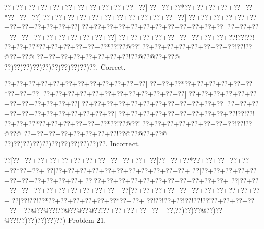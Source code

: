 \documentclass[a5paper]{article}
\begin{document}
\begin{center}
{\goo
\0??+\0??+\0??+\0??+\0??+\0??+\0??+\0??+\0??+\0??+\0??+\0??]
\0??+\0??+\0??*\0??+\0??+\0??+\0??+\0??+\0??*\0??+\0??+\0??]
\0??+\0??+\0??+\0??+\0??+\0??+\0??+\0??+\0??+\0??+\0??+\0??]
\0??+\0??+\0??+\0??+\0??+\0??+\0??+\0??+\0??+\0??+\0??+\0??]
\0??+\0??+\0??+\0??+\0??+\0??+\0??+\0??+\0??+\0??+\0??+\0??]
\0??+\0??+\0??+\0??+\0??+\0??+\0??+\0??+\0??+\0??+\0??+\0??]
\0??+\0??+\0??+\0??+\0??+\0??+\0??+\0??+\0??+\0??!\0??!\0??!
\0??+\0??+\0??*\0??+\0??+\0??+\0??+\0??+\0??*\0??!\0??@\0??!
\0??+\0??+\0??+\0??+\0??+\0??+\0??+\0??!\0??!\0??@\0??+\0??@
\0??+\0??+\0??+\0??+\0??+\0??+\0??+\0??!\0??@\0??@\0??+\0??@
\0??)\0??)\0??)\0??)\0??)\0??)\0??)\0??)\0??)\0??.
}
Correct. 

\end{center}
\begin{center}
{\goo
\0??+\0??+\0??+\0??+\0??+\0??+\0??+\0??+\0??+\0??+\0??+\0??]
\0??+\0??+\0??*\0??+\0??+\0??+\0??+\0??+\0??*\0??+\0??+\0??]
\0??+\0??+\0??+\0??+\0??+\0??+\0??+\0??+\0??+\0??+\0??+\0??]
\0??+\0??+\0??+\0??+\0??+\0??+\0??+\0??+\0??+\0??+\0??+\0??]
\0??+\0??+\0??+\0??+\0??+\0??+\0??+\0??+\0??+\0??+\0??+\0??]
\0??+\0??+\0??+\0??+\0??+\0??+\0??+\0??+\0??+\0??+\0??+\0??]
\0??+\0??+\0??+\0??+\0??+\0??+\0??+\0??+\0??+\0??!\0??!\0??!
\0??+\0??+\0??*\0??+\0??+\0??+\0??+\0??+\0??*\0??!\0??@\0??!
\0??+\0??+\0??+\0??+\0??+\0??+\0??+\0??!\0??!\0??@\0??@
\0??+\0??+\0??+\0??+\0??+\0??+\0??+\0??!\0??@\0??@\0??+\0??@
\0??)\0??)\0??)\0??)\0??)\0??)\0??)\0??)\0??)\0??)\0??.
}
Incorrect. 

\end{center}
\newpage
\begin{center}
{\goo
\0??[\0??+\0??+\0??+\0??+\0??+\0??+\0??+\0??+\0??+\0??+\0??+
\0??[\0??+\0??+\0??*\0??+\0??+\0??+\0??+\0??+\0??*\0??+\0??+
\0??[\0??+\0??+\0??+\0??+\0??+\0??+\0??+\0??+\0??+\0??+\0??+
\0??[\0??+\0??+\0??+\0??+\0??+\0??+\0??+\0??+\0??+\0??+\0??+
\0??[\0??+\0??+\0??+\0??+\0??+\0??+\0??+\0??+\0??+\0??+\0??+
\0??[\0??+\0??+\0??+\0??+\0??+\0??+\0??+\0??+\0??+\0??+\0??+
\0??[\0??+\0??+\0??+\0??+\0??+\0??+\0??+\0??+\0??+\0??+\0??+
\0??[\0??!\0??!\0??*\0??+\0??+\0??+\0??+\0??+\0??*\0??+\0??+
\0??!\0??!\0??+\0??!\0??!\0??!\0??!\0??+\0??+\0??+\0??+\0??+
\0??@\0??@\0??!\0??@\0??@\0??@\0??!\0??+\0??+\0??+\0??+\0??+
\0??,\0??)\0??)\0??@\0??)\0??@\0??!\0??)\0??)\0??)\0??)\0??)
}
Problem 21.

\end{center}
\end{document}
